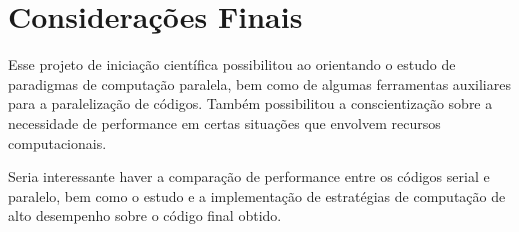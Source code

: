 \chapter{Considerações Finais}

Esse projeto de iniciação científica possibilitou ao orientando o estudo de paradigmas de computação paralela, bem como de algumas ferramentas auxiliares para a paralelização de códigos. Também possibilitou a conscientização sobre a necessidade de performance em certas situações que envolvem recursos computacionais.

Seria interessante haver a comparação de performance entre os códigos serial e paralelo, bem como o estudo e a implementação de estratégias de computação de alto desempenho sobre o código final obtido.